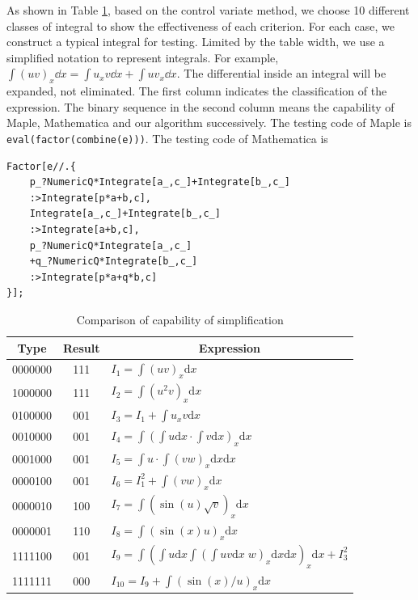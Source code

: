 As shown in Table \ref{tb1}, based on the control variate method, we choose 10 different classes of integral to show the effectiveness of each criterion. For each case, we construct a typical integral for testing. Limited by the table width, we use a simplified notation to represent integrals. For example, $\int\!{(uv)_x\dd x}=\int\!{u_xv\dd x}+\int\!{uv_x\dd x}$. The differential inside an integral will be expanded, not eliminated. The first column indicates the classification of the expression. The binary sequence in the second column means the capability of Maple, Mathematica and our algorithm successively. The testing code of Maple is \texttt{eval(factor(combine(e)))}. The testing code of Mathematica is 
\begin{verbatim}
Factor[e//.{
    p_?NumericQ*Integrate[a_,c_]+Integrate[b_,c_]
    :>Integrate[p*a+b,c],
    Integrate[a_,c_]+Integrate[b_,c_]
    :>Integrate[a+b,c],
    p_?NumericQ*Integrate[a_,c_]
    +q_?NumericQ*Integrate[b_,c_]
    :>Integrate[p*a+q*b,c]
}];
\end{verbatim}

\begin{table}[htb]
\renewcommand{\arraystretch}{1.25}
\centering
\caption{Comparison of capability of simplification} \label{tb1}
\renewcommand{\dd}[1]{\mathrm{d}#1}
\renewcommand{\ii}[1]{\int\!{#1\dd x}}
\begin{tabular}{ccl}
\hline
Type & Result & \multicolumn{1}{c}{Expression} \\
\hline
0000000 & 111 & $I_1=\int\!{(uv)_x\dd x}$\\ 
1000000 & 111 & $I_2=\int\!{(u^2v)_x\dd x}$\\ 
0100000 & 001 & $I_3=I_1+\int\!{u_xv\dd x}$\\ 
0010000 & 001 & $I_4=\int\!{(\int\!{u\dd x}\cdot \int\!{v\dd x})_x\dd x}$\\
0001000 & 001 & $I_5=\int\!{u\cdot \int\!{(vw)_x\dd x}\dd x}$\\
0000100 & 001 & $I_6=I_1^2+\int\!{(vw)_x\dd x}$\\
0000010 & 100 & $I_7=\int\!{(\sin(u)\sqrt{v})_x\dd x}$\\
0000001 & 110 & $I_8=\int\!{(\sin(x)u)_x\dd x}$\\
1111100 & 001 & $I_9=\int\!{(\int\!{u\dd x}\int\!{(\int\!{uv\dd x}\;w)_x\dd x\dd x})_x\dd x}+I_3^2$\\
1111111 & 000 & $I_{10}=I_9+\int\!{(\sin(x)/u)_x\dd x}$\\
\hline
\end{tabular}
\end{table} 

